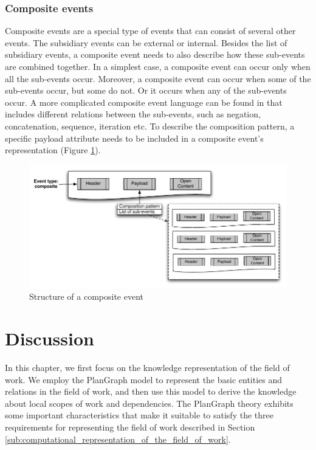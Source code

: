 \subsubsection{Composite events} %
\label{ssub:composite_events}
Composite events are a special type of events that can consist of several other events. The subsidiary events can be external or internal. Besides the list of subsidiary events, a composite event needs to also describe how these sub-events are combined together. In a simplest case, a composite event can occur only when all the sub-events occur. Moreover, a composite event can occur when some of the sub-events occur, but some do not. Or it occurs when any of the sub-events occur. A more complicated composite event language can be found in \cite{Mhl2010} that includes different relations between the sub-events, such as negation, concatenation, sequence, iteration etc. To describe the composition pattern, a specific payload attribute needs to be included in a composite event's representation (Figure \ref{fig:composite_event}).
\begin{figure}[htbp] %
	\centering
	\includegraphics{composite_event.pdf} 
	\caption{Structure of a composite event}
	\label{fig:composite_event}
\end{figure}

\section{Discussion} %
\label{sec:knowledge_representation_discussion}
In this chapter, we first focus on the knowledge representation of the field of work. We employ the PlanGraph model to represent the basic entities and relations in the field of work, and then use this model to derive the knowledge about local scopes of work and dependencies. The PlanGraph theory exhibits some important characteristics that make it suitable to satisfy the three requirements for representing the field of work described in Section \ref{sub:computational_representation_of_the_field_of_work}.

